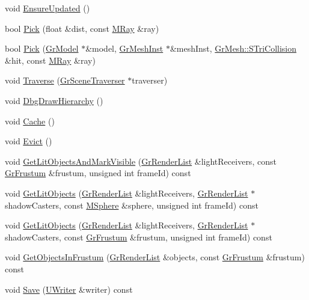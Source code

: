 \begin{CompactItemize}
void \hyperlink{class_gr_model_12002759a1e3c55bf2ec71d21f197a0d}{EnsureUpdated} ()
\item 
bool \hyperlink{class_gr_model_fbbc5426863525467f35ff2df3cca3ce}{Pick} (float \&dist, const \hyperlink{class_m_ray}{MRay} \&ray)
\item 
bool \hyperlink{class_gr_model_525915234ad6fe9e03ee62e699d27fad}{Pick} (\hyperlink{class_gr_model}{GrModel} $\ast$\&model, \hyperlink{class_gr_mesh_inst}{GrMeshInst} $\ast$\&meshInst, \hyperlink{struct_gr_mesh_1_1_s_tri_collision}{GrMesh::STriCollision} \&hit, const \hyperlink{class_m_ray}{MRay} \&ray)
\item 
void \hyperlink{class_gr_model_89501566d6de6f63cda4527fb7cae760}{Traverse} (\hyperlink{class_gr_scene_traverser}{GrSceneTraverser} $\ast$traverser)
\item 
void \hyperlink{class_gr_model_a125d73b384a3353dfbac65a93588282}{DbgDrawHierarchy} ()
\item 
void \hyperlink{class_gr_model_d3a2e4287aebf5351e971b9b64dbbe11}{Cache} ()
\item 
void \hyperlink{class_gr_model_2b4b150bcaf7982b1e70cb80549bc704}{Evict} ()
\item 
void \hyperlink{class_gr_model_c6e775a1ef9fd0321916e99a2de5db2d}{GetLitObjectsAndMarkVisible} (\hyperlink{class_gr_render_list}{GrRenderList} \&lightReceivers, const \hyperlink{class_gr_frustum}{GrFrustum} \&frustum, unsigned int frameId) const 
\item 
void \hyperlink{class_gr_model_4dbbe93eef470aa2339ae8921535780a}{GetLitObjects} (\hyperlink{class_gr_render_list}{GrRenderList} \&lightReceivers, \hyperlink{class_gr_render_list}{GrRenderList} $\ast$shadowCasters, const \hyperlink{class_m_sphere}{MSphere} \&sphere, unsigned int frameId) const 
\item 
void \hyperlink{class_gr_model_6533ef543b8238ce8434256f02be5f07}{GetLitObjects} (\hyperlink{class_gr_render_list}{GrRenderList} \&lightReceivers, \hyperlink{class_gr_render_list}{GrRenderList} $\ast$shadowCasters, const \hyperlink{class_gr_frustum}{GrFrustum} \&frustum, unsigned int frameId) const 
\item 
void \hyperlink{class_gr_model_d152158878fd8ee7d0f4f07915c54d01}{GetObjectsInFrustum} (\hyperlink{class_gr_render_list}{GrRenderList} \&objects, const \hyperlink{class_gr_frustum}{GrFrustum} \&frustum) const 
\item 
void \hyperlink{class_gr_model_94605ad2262faa9e3e858cd2f9b5d9d1}{Save} (\hyperlink{class_u_writer}{UWriter} \&writer) const 
\item 

\end{CompactItemize}
